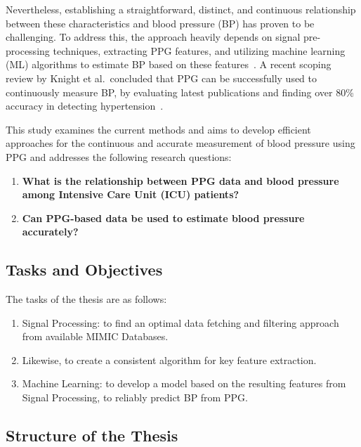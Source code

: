 Nevertheless, establishing a straightforward, distinct, and continuous relationship between these characteristics and blood pressure (BP) has proven to be challenging.
To address this, the approach heavily depends on signal pre-processing techniques, extracting PPG features, and utilizing machine learning (ML) algorithms to estimate BP based on these features~\cite{el-hajjDeepLearningModels2021}.
A recent scoping review by Knight et al.\ concluded that PPG can be successfully used to continuously measure BP, by evaluating latest publications and finding over 80\% accuracy in detecting hypertension~\cite{knightAccuracyWearablePhotoplethysmography2022}.

This study examines the current methods and aims to develop efficient approaches for the continuous and accurate measurement of blood pressure using PPG and addresses the following research questions:

\begin{enumerate}
    \item \textbf{What is the relationship between PPG data and blood pressure among Intensive Care Unit (ICU) patients?}

    \item \textbf{Can PPG-based data be used to estimate blood pressure accurately?}

\end{enumerate}

\subsection{Tasks and Objectives}
\label{subsec:tasks_objectives}

The tasks of the thesis are as follows:

\begin{enumerate}
    \item Signal Processing: to find an optimal data fetching and filtering approach from available MIMIC Databases.
    \item Likewise, to create a consistent algorithm for key feature extraction.
    \item Machine Learning: to develop a model based on the resulting features from Signal Processing, to reliably predict BP from PPG\@.
\end{enumerate}

\subsection{Structure of the Thesis}
\label{subsec:structure}

